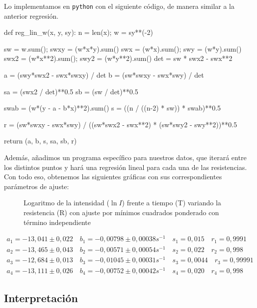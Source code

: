 \documentclass[12pt, a4paper, titlepage]{article}
\newcommand{\code}[1]{\texttt{#1}} %
\begin{document}
  Lo implementamos en \code{python} con el siguiente código, de manera similar a la anterior regresión.

  \begin{python}
    def reg_lin_w(x, y, sy):
        n = len(x); w = sy**(-2)

        sw = w.sum(); swxy = (w*x*y).sum()
        swx = (w*x).sum(); swy = (w*y).sum()
        swx2 = (w*x**2).sum(); swy2 = (w*y**2).sum()
        det = sw * swx2 - swx**2

        a = (swy*swx2 - swx*swxy) / det
        b = (sw*swxy - swx*swy) / det

        sa = (swx2 / det)**0.5
        sb = (sw / det)**0.5

        swab = (w*(y - a - b*x)**2).sum()
        s = ((n / ((n-2) * sw)) * swab)**0.5

        r = (sw*swxy - swx*swy) / ((sw*swx2 - swx**2) * (sw*swy2 - swy**2))**0.5

        return (a, b, s, sa, sb, r)
  \end{python}

  Además, añadimos un programa específico para nuestros datos, que iterará entre los distintos puntos y hará una regresión lineal para cada una de las resistencias. Con todo eso, obtenemos las siguientes gráficas con sus correspondientes parámetros de ajuste:

  \begin{figure}[H]
    \hspace{0.2em} 
    \caption{Logaritmo de la intensidad ($\ln{I}$) frente a tiempo (T) variando la resistencia (R) con ajuste por mínimos cuadrados ponderado con término independiente}
  \end{figure}

  \begin{gather*}
    a_1 = -13,041 \pm 0,022 \quad b_1 = -0,00798 \pm 0,00038 s^{-1} \quad s_1 = 0,015 \quad r_1 = 0,9991 \\
    a_2 = -13,465 \pm 0,043 \quad b_2 = -0,00571 \pm 0,00054 s^{-1} \quad s_2 = 0,022 \quad r_2 = 0,998 \\
    a_3 = -12,684 \pm 0,013 \quad b_3 = -0,01045 \pm 0,00031 s^{-1} \quad s_3 = 0,0044 \quad r_3 = 0,99991 \\
    a_4 = -13,111 \pm 0,026 \quad b_4 = -0,00752 \pm 0,00042 s^{-1} \quad s_4 = 0,020 \quad r_4 = 0,998
  \end{gather*}

  \newpage
  \subsection{Interpretación}
\end{document}
